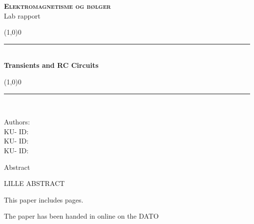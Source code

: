 \documentclass[../main/main.tex]{subfiles}
\begin{document}
\vspace*{40mm}


\begin{center}
{\textsc {\Large \bf Elektromagnetisme og bølger}}\\[0.8cm]
{\Large Lab rapport}\\[1cm]

{\color[cmyk]{.60,0,.80,.40}\line(1,0){0}\rule{15cm}{0.01cm}}\\[1cm]
{\LARGE\bf  Transients and RC Circuits}\\ [0.5cm]
{\color[cmyk]{.60,0,.80,.40}\line(1,0){0}\rule{15cm}{0.01cm}}\\[1cm]
\end{center}

{\large Authors:}\\
{\large \hspace*{1cm}   \hspace{1cm} KU- ID: } \\
{\large \hspace*{1cm}    \hspace{1cm} KU- ID: } \\
{\large \hspace*{1cm}    \hspace{1cm} KU- ID: } \\

\begin{dualabstract}{Abstract}

LILLE ABSTRACT

\end{dualabstract}

{\small This paper includes {\bf \pageref{lastpage}} pages.}

{\small The paper has been handed in online on the DATO }

\normalsize
\end{document}
